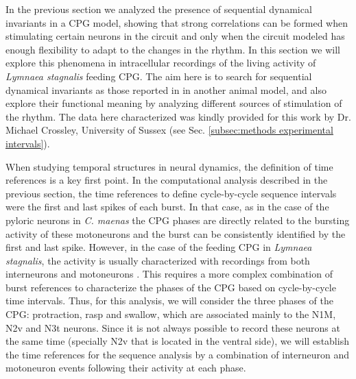 In the previous section we analyzed the presence of sequential dynamical invariants in a CPG model, showing that strong correlations can be formed when stimulating certain neurons in the circuit and only when the circuit modeled has enough flexibility to adapt to the changes in the rhythm. In this section we will explore this phenomena in intracellular recordings of the living activity of \textit{Lymnaea stagnalis} feeding CPG. The aim here is to search for sequential dynamical invariants as those reported in \textcite{elices_robust_2019} in another animal model, and also explore their functional meaning by analyzing different sources of stimulation of the rhythm. The data here characterized was kindly provided for this work by Dr. Michael Crossley, University of Sussex (see Sec. \ref{subsec:methods experimental intervals}).

When studying temporal structures in neural dynamics, the definition of time references is a key first point. In the computational analysis described in the previous section, the time references to define cycle-by-cycle sequence intervals were the first and last spikes of each burst. In that case, as in the case of the pyloric neurons in \textit{C. maenas} the CPG phases are directly related to the bursting activity of these motoneurons and the burst can be consistently identified by the first and last spike. However, in the case of the feeding CPG in \textit{Lymnaea stagnalis}, the activity is usually characterized with recordings from both interneurons and motoneurons \parencite{elliott_interactions_1985, staras_patterngenerating_1998, benjamin_distributed_2012}. This requires a more complex combination of burst references to characterize the phases of the CPG based on cycle-by-cycle time intervals. Thus, for this analysis, we will consider the three phases of the CPG: protraction, rasp and swallow, which are associated mainly to the N1M, N2v and N3t neurons. Since it is not always possible to record these neurons at the same time (specially N2v that is located in the ventral side), we will establish the time references for the sequence analysis by a combination of interneuron and motoneuron events following their activity at each phase. 

